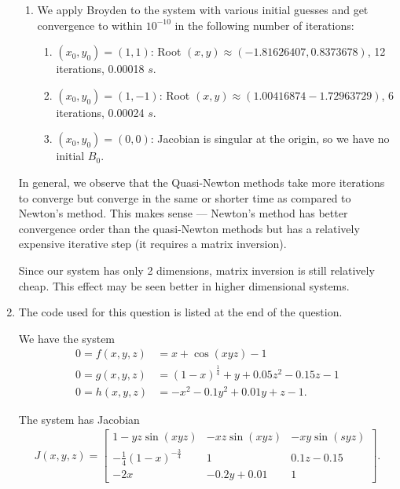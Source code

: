 \documentclass[10pt]{article}
\begin{document}
\begin{enumerate}
\begin{enumerate}
      \item We apply Broyden to the system with various initial guesses and get convergence to within \(10^{-10}\) in the following number of iterations:
      \begin{enumerate}
        \item \((x_0, y_0) = (1, 1)\): Root \((x, y) \approx (-1.81626407, 0.8373678)\), 12 iterations, 0.00018 \(s\).
        \item \((x_0, y_0) = (1, -1)\):  Root \((x, y) \approx (1.00416874 -1.72963729)\), 6 iterations, 0.00024 \(s\).
        \item \((x_0, y_0) = (0, 0)\): Jacobian is singular at the origin, so we have no initial \(B_0\).
      \end{enumerate}
    \end{enumerate}

    In general, we observe that the Quasi-Newton methods take more iterations to converge but converge in the same or shorter time as compared to Newton's method. This makes sense --- Newton's method has better convergence order than the quasi-Newton methods but has a relatively expensive iterative step (it requires a matrix inversion). 
    
    Since our system has only 2 dimensions, matrix inversion is still relatively cheap. This effect may be seen better in higher dimensional systems.

    {\small }

    \newpage

    \item The code used for this question is listed at the end of the question.
    
    We have the system \begin{align*}
        0 = f(x, y, z) &= x + \cos(xyz)-1 \\
        0 = g(x, y, z) &= (1-x)^{\frac{1}{4}} + y + 0.05z^2 - 0.15z -1 \\
        0 = h(x,y,z) &= -x^2 - 0.1y^2 + 0.01y + z - 1.
    \end{align*}

    The system has Jacobian \begin{align*}
        J(x, y, z) = \begin{bmatrix}
          1 - yz\sin(xyz) & -xz\sin(xyz) & -xy\sin(syz) \\
          -\frac{1}{4}(1-x)^{-\frac{3}{4}} & 1 & 0.1z - 0.15 \\
          -2x & -0.2y + 0.01 & 1
        \end{bmatrix}.
    \end{align*}


\end{enumerate}
\end{document}
